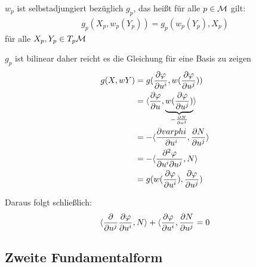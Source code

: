 \begin{satz}
$w_p$ ist selbstadjungiert bezüglich $g_p$, das heißt für alle $p\in\mathcal{M}$ gilt:
\begin{align*}
    g_p (X_p , w_p (Y_p)) = g_p (w_p (Y_p) , X_p)
\end{align*}
für alle $X_p, Y_p \in T_p\mathcal{M}$
\end{satz}
\begin{bew}
    $g_p$ ist bilinear daher reicht es die Gleichung für eine Basis zu zeigen
    \begin{align*}
        g (X , w Y) &= g ( \pdv{\varphi}{u^i} , w (\pdv{\varphi}{u^j})) \\
        &= \langle \pdv{\varphi}{u} , \underbrace{w ( \pdv{\varphi}{u^j})}_{- \pdv{N}{u^j}} \rangle \\
        &= - \langle \pdv{varphi}{u^i} , \pdv{N}{u^j} \rangle \\
        &= - \langle \frac{\partial^2 \varphi}{\partial u^i \partial u^j} , N \rangle\\
        &= g ( w (\pdv{\varphi}{u^i}) , \pdv{\varphi}{u^j} )
    \end{align*}

    Daraus folgt schließlich:
    \begin{align}
        \langle \pdv{u^j} \pdv{\varphi}{u^i} , N \rangle + \langle \pdv{\varphi}{u^i} , \pdv{N}{u^j} = 0
    \end{align} 
\end{bew}

\subsection{Zweite Fundamentalform}

